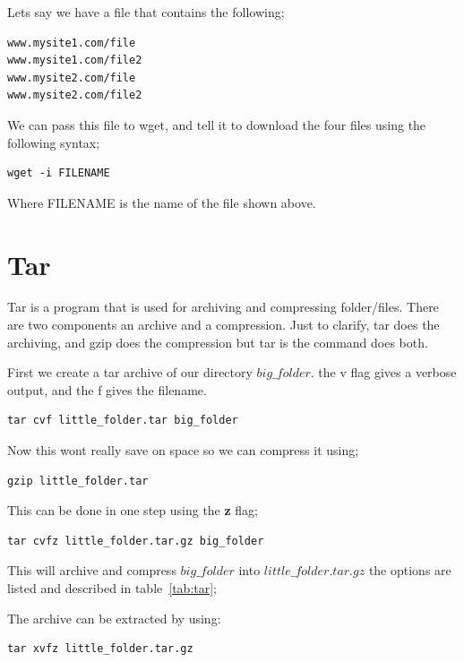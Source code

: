 Lets say we have a file that contains the following;

\begin{verbatim}
www.mysite1.com/file
www.mysite1.com/file2
www.mysite2.com/file
www.mysite2.com/file2
\end{verbatim}

We can pass this file to wget, and tell it to download the four files using the following syntax;

\begin{lstlisting}
wget -i FILENAME
\end{lstlisting}

Where FILENAME is the name of the file shown above.


\section{Tar}

Tar is a program that is used for archiving and compressing folder/files. There are two components an archive and a compression.  Just to clarify, tar does the archiving, and gzip does the compression but tar is the command does both.

First we create a tar archive of our directory $big\_folder$.  the v flag gives a verbose output, and the f gives the filename.

\begin{lstlisting}
tar cvf little_folder.tar big_folder
\end{lstlisting}

Now this wont really save on space so we can compress it using;

\begin{lstlisting}
gzip little_folder.tar
\end{lstlisting}

This can be done in one step using the \textbf{z} flag;

\begin{lstlisting}
tar cvfz little_folder.tar.gz big_folder
\end{lstlisting}

This will archive and compress $big\_folder$ into $little\_folder.tar.gz$ the options are listed and described in table~\ref{tab:tar};

The archive can be extracted by using:

\begin{lstlisting}
tar xvfz little_folder.tar.gz
\end{lstlisting}

